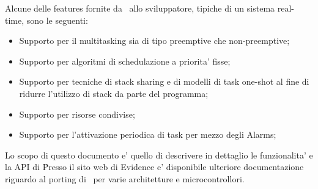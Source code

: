 Alcune delle features fornite da \ee\ allo sviluppatore, tipiche di un sistema real-time,
sono le seguenti:
\begin{itemize}
  \item Supporto per il multitasking sia di tipo preemptive che non-preemptive;
  \item Supporto per algoritmi di schedulazione a priorita' fisse;
  \item Supporto per tecniche di stack sharing e di modelli di task one-shot 
  al fine di ridurre l'utilizzo di stack da parte del programma;
  \item Supporto per risorse condivise;
  \item Supporto per l'attivazione periodica di task per mezzo degli Alarms;
\end{itemize}

Lo scopo di questo documento e' quello di descrivere in dettaglio le funzionalita' e la
API di \ee\. Presso il sito web di Evidence e' disponibile ulteriore documentazione
riguardo al porting di \ee\ per varie architetture e microcontrollori.
